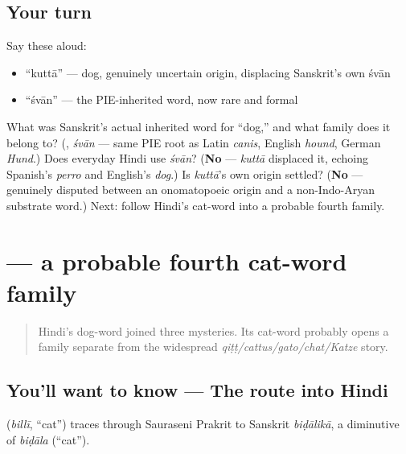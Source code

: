 \subsection*{Your turn}
Say these aloud:

\begin{itemize}
\raggedright
  \item \textquotedblleft{}kuttā\textquotedblright{} — dog, genuinely uncertain origin, displacing Sanskrit's own śvān
  \item \textquotedblleft{}śvān\textquotedblright{} — the PIE-inherited word, now rare and formal
\end{itemize}

\begin{tcolorbox}[breakable,colback=teal!4,colframe=teal!35!black,title={Before you move on}]
What was Sanskrit's actual inherited word for \textquotedblleft{}dog,\textquotedblright{} and what family does it belong to? (\textbf{}, \emph{śvān} — same PIE root as Latin \emph{canis}, English \emph{hound}, German \emph{Hund}.) Does everyday Hindi use \emph{śvān}? (\textbf{No} — \emph{kuttā} displaced it, echoing Spanish's \emph{perro} and English's \emph{dog}.) Is \emph{kuttā}'s own origin settled? (\textbf{No} — genuinely disputed between an onomatopoeic origin and a non-Indo-Aryan substrate word.) Next: follow Hindi's cat-word into a probable fourth family.
\end{tcolorbox}
\section[\texorpdfstring{\hi{बिल्ली} (billī)}{बिल्ली (billī)}]{ — a probable fourth cat-word family}

\label{lesson:HI-C23-billi-history}



\begin{quote}
Hindi's dog-word joined three mysteries. Its cat-word probably opens a family separate from the widespread \emph{qiṭṭ/cattus/gato/chat/Katze} story.
\end{quote}

\subsection*{You'll want to know — The route into Hindi}
\textbf{} (\emph{billī}, \textquotedblleft{}cat\textquotedblright{}) traces through Sauraseni Prakrit to Sanskrit \emph{biḍālikā}, a diminutive of \emph{biḍāla} (\textquotedblleft{}cat\textquotedblright{}).

